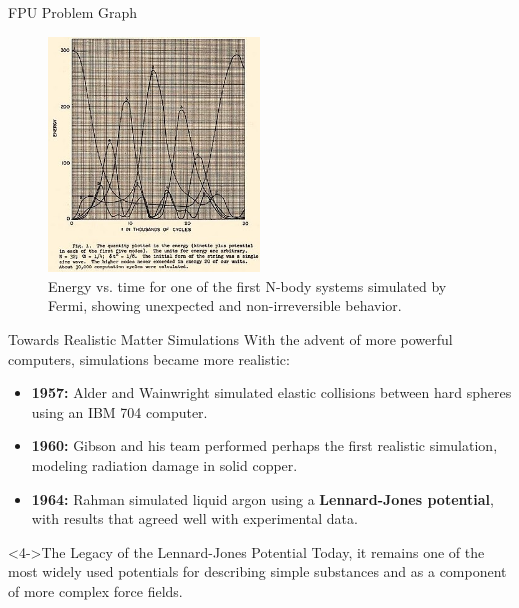 \begin{frame}{FPU Problem Graph}
    \begin{figure}
        \includegraphics[width=0.5\textwidth]{images/MANIAC.png}
        \caption{Energy vs. time for one of the first N-body systems simulated by Fermi, showing unexpected and non-irreversible behavior.}
    \end{figure}
\end{frame}


\begin{frame}{Towards Realistic Matter Simulations}
    \footnotesize
    With the advent of more powerful computers, simulations became more realistic:
    \pause
    
    \begin{itemize}
        \item \textbf{1957:} Alder and Wainwright simulated elastic collisions between hard spheres using an IBM 704 computer.
        \pause
        \bigskip
        \item \textbf{1960:} Gibson and his team performed perhaps the first realistic simulation, modeling radiation damage in solid copper.
        \pause
        \bigskip
        \item \textbf{1964:} Rahman simulated liquid argon using a \textbf{Lennard-Jones potential}, with results that agreed well with experimental data.
    \end{itemize}
    \pause
    
    \begin{alertblock}<4->{The Legacy of the Lennard-Jones Potential}
        Today, it remains one of the most widely used potentials for describing simple substances and as a component of more complex force fields.
    \end{alertblock}
\end{frame}

